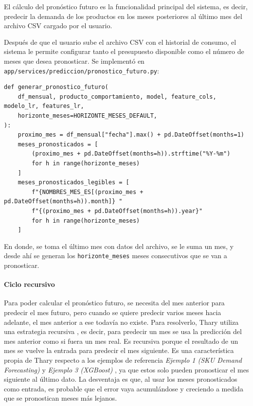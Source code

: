 El cálculo del pronóstico futuro es la funcionalidad principal del sistema, es decir, predecir la demanda de los productos en los meses posteriores al último mes del archivo CSV cargado por el usuario.

Después de que el usuario sube el archivo CSV con el historial de consumo, el sistema le permite configurar tanto el presupuesto disponible como el número de meses que desea pronosticar. Se implementó en \texttt{app/services/prediccion/pronostico\_futuro.py}:

\begin{verbatim}
def generar_pronostico_futuro(
    df_mensual, producto_comportamiento, model, feature_cols, modelo_lr, features_lr,
    horizonte_meses=HORIZONTE_MESES_DEFAULT,
):
    proximo_mes = df_mensual["fecha"].max() + pd.DateOffset(months=1)
    meses_pronosticados = [
        (proximo_mes + pd.DateOffset(months=h)).strftime("%Y-%m")
        for h in range(horizonte_meses)
    ]
    meses_pronosticados_legibles = [
        f"{NOMBRES_MES_ES[(proximo_mes + pd.DateOffset(months=h)).month]} "
        f"{(proximo_mes + pd.DateOffset(months=h)).year}"
        for h in range(horizonte_meses)
    ]
\end{verbatim}

En donde, se toma el último mes con datos del archivo, se le suma un mes, y desde ahí se generan los \texttt{horizonte\_meses} meses consecutivos que se van a pronosticar.

\paragraph{Ciclo recursivo}

Para poder calcular el pronóstico futuro, se necesita del mes anterior para predecir el mes futuro, pero cuando se quiere predecir varios meses hacia adelante, el mes anterior a ese todavía no existe. Para resolverlo, Thary utiliza una estrategia recursiva \cite{BENTAIEB20127067}, es decir, para predecir un mes se usa la predicción del mes anterior como si fuera un mes real. Es recursiva porque el resultado de un mes se vuelve la entrada para predecir el mes siguiente. Es una característica propia de Thary respecto a los ejemplos de referencia \textit{Ejemplo 1 (SKU Demand Forecasting)} \cite{ejemplo1_demandforecast} y \textit{Ejemplo 3 (XGBoost)} \cite{ejemplo3_ksmooi_inventorydemand}, ya que estos solo pueden pronosticar el mes siguiente al último dato. La desventaja es que, al usar los meses pronosticados como entrada, es probable que el error vaya acumulándose y creciendo a medida que se pronostican meses más lejanos.

